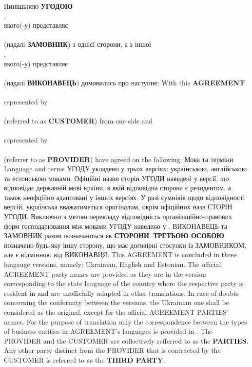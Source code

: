 \begin{Form}
    \begin{paracol}{3}
      \freetext %
        {Нинішьною \textbf{УГОДОЮ}\\
          ,\\
          якого(-у) представляє\\
          \\
          (надалі \textbf{ЗАМОВНИК}) з однієї сторони, а з іншої\\
          ,\\
          якого(-у) представляє\\
          \\
          (надалі \textbf{ВИКОНАВЕЦЬ}) домовились про наступне:
        }
        { With this \textbf{AGREEMENT}\\
          \\
          represented by\\
          \\
          (referred to as \textbf{CUSTOMER}) from one side and\\
          \\
          represented by\\
          \\
          (referrer to as \textbf{PROVIDER}) have agreed on the following:
          }
        {}
      \clause
        {Мова та терміни}
        {Language and terms}
        {}
        {УГОДУ укладено у трьох версіях: українською, англійською та естонською мовами. Офіційні назви сторін УГОДИ наведені у версії, що відповідає державній мові країни, в якій відповідна сторона є резидентом, а також неофційно адаптовані у інших версіях. У разі сумнівів щодо відповідності версій, українська вважатиметься оригіналом, окрім офіційних назв СТОРІН УГОДИ. Виключно з метою перекладу відповідність ор\-га\-ні\-за\-цій\-но-правових форм господарювання між мовами УГОДУ наведено у . ВИКОНАВЕЦЬ та ЗАМОВНИК разом позначаються як \textbf{СТОРОНИ}. \textbf{ТРЕТЬОЮ ОСОБОЮ} позначено будь-яку іншу сторону, що має договірні стосунки із ЗАМОВНИКОМ, але є відмінною від ВИКОНАВЦЯ.}
        {This AGREEMENT is concluded in three langauge versions, na\-me\-ly: Ukrainian, English and Estonian. The official AGREEMENT party names are provided as they are in the version corresponding to the state language of the country where the respective party is resident in and are unofficially adapted in other translations. In case of doubts concerning the conformity between the versions, the Ukrainian one shall be considered as the original, except for the official AGREEMENT PARTIES' names. For the purpose of translation only the correspondence between the types of business entities in AGREEMENT's languages is provided in . The PROVIDER and the CUSTOMER are collectively refferred to as the \textbf{PARTIES}. Any other party distinct from the PROVIDER that is contracted by the CUSTOMER is referred to as the \textbf{THIRD PARTY}.}

\end{paracol}
\end{Form}
